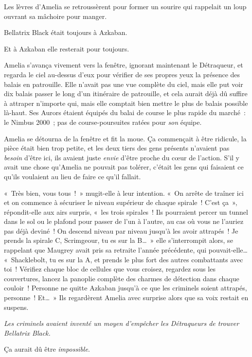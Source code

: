 Les lèvres d'Amelia se retroussèrent pour former un sourire qui rappelait un loup ouvrant sa mâchoire pour manger.

Bellatrix Black était toujours à Azkaban.

Et à Azkaban elle resterait pour toujours.

Amelia s'avança vivement vers la fenêtre, ignorant maintenant le Détraqueur, et regarda le ciel au-dessus d'eux pour vérifier de ses propres yeux la présence des balais en patrouille.
Elle n'avait pas une vue complète du ciel, mais elle put voir dix balais passer le long d'un itinéraire de patrouille, et cela aurait déjà dû suffire à attraper n'importe qui, mais elle comptait bien mettre le plus de balais possible là-haut.
Ses Aurors étaient équipés du balai de course le plus rapide du marché~: le Nimbus 2000~; pas de course-poursuites ratées pour \emph{son} équipe.

Amelia se détourna de la fenêtre et fit la moue.
Ça commençait à être ridicule, la pièce était bien trop petite, et les deux tiers des gens présents n'avaient pas \emph{besoin} d'être ici, ils avaient juste \emph{envie} d'être proche du cœur de l'action.
S'il y avait une chose qu'Amelia ne pouvait pas tolérer, c'était les gens qui faisaient ce qu'ils voulaient au lieu de faire ce qu'il fallait.

«~Très bien, vous tous~!~»
mugit-elle à leur intention.
«~On arrête de traîner ici et on commence à sécuriser le niveau supérieur de chaque spirale~!
C'est ça~», répondit-elle aux airs surpris, «~les trois spirales~!
Ils pourraient percer un tunnel dans le sol ou le plafond pour passer de l'un à l'autre, au cas où vous ne l'auriez pas déjà deviné~!
On descend niveau par niveau jusqu'à les avoir attrapés~!
Je prends la spirale C, Scrimgeour, tu es sur la B…~»
elle s'interrompit alors, se rappelant que Maugrey avait pris sa retraite l'année précédente, qui pouvait-elle…
«~Shacklebolt, tu es sur la A, et prends le plus fort des autres combattants avec toi~!
Vérifiez chaque bloc de cellules que vous croisez, regardez sous les couvertures, lancez la panoplie complète des charmes de détection dans chaque couloir~!
Personne ne quitte Azkaban jusqu'à ce que les criminels soient attrapés, personne~!
Et…~» Ils regardèrent Amelia avec surprise alors que sa voix restait en suspens.

\emph{Les criminels avaient inventé un moyen d'empêcher les Détraqueurs de trouver Bellatrix Black.}

Ça aurait dû être \emph{impossible}.

